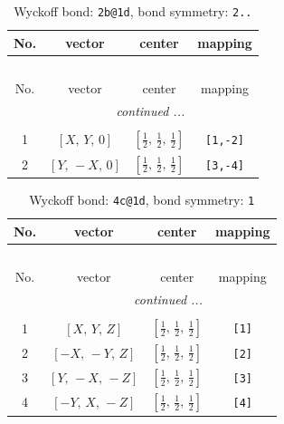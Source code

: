\documentclass[fleqn,8pt]{jsarticle}
\begin{document}
\renewcommand{\arraystretch}{1.2}
\begin{longtable}{cccc}
\caption{Wyckoff bond: {\tt 2b@1d}, bond symmetry: {\tt 2..}}
 \\
 \hline \hline
No. & vector & center & mapping \\ \hline \endfirsthead

\multicolumn{3}{l}{\tablename\ \thetable{}} \\
 \hline \hline
No. & vector & center & mapping \\ \hline \endhead

 \hline \hline
\multicolumn{3}{r}{\footnotesize\it continued ...} \\ \endfoot

 \hline \hline
\multicolumn{3}{r}{} \\ \endlastfoot

1 & $\left[ X,\, Y,\, 0 \right]$ & $\left[ \frac{1}{2},\, \frac{1}{2},\, \frac{1}{2} \right]$ & {\tt [1,-2]} \\ \hline
2 & $\left[ Y,\, - X,\, 0 \right]$ & $\left[ \frac{1}{2},\, \frac{1}{2},\, \frac{1}{2} \right]$ & {\tt [3,-4]} \\
\end{longtable}
\renewcommand{\arraystretch}{1.2}
\begin{longtable}{cccc}
\caption{Wyckoff bond: {\tt 4c@1d}, bond symmetry: {\tt 1}}
 \\
 \hline \hline
No. & vector & center & mapping \\ \hline \endfirsthead

\multicolumn{3}{l}{\tablename\ \thetable{}} \\
 \hline \hline
No. & vector & center & mapping \\ \hline \endhead

 \hline \hline
\multicolumn{3}{r}{\footnotesize\it continued ...} \\ \endfoot

 \hline \hline
\multicolumn{3}{r}{} \\ \endlastfoot

1 & $\left[ X,\, Y,\, Z \right]$ & $\left[ \frac{1}{2},\, \frac{1}{2},\, \frac{1}{2} \right]$ & {\tt [1]} \\ \hline
2 & $\left[ - X,\, - Y,\, Z \right]$ & $\left[ \frac{1}{2},\, \frac{1}{2},\, \frac{1}{2} \right]$ & {\tt [2]} \\ \hline
3 & $\left[ Y,\, - X,\, - Z \right]$ & $\left[ \frac{1}{2},\, \frac{1}{2},\, \frac{1}{2} \right]$ & {\tt [3]} \\ \hline
4 & $\left[ - Y,\, X,\, - Z \right]$ & $\left[ \frac{1}{2},\, \frac{1}{2},\, \frac{1}{2} \right]$ & {\tt [4]} \\
\end{longtable}
\end{document}
